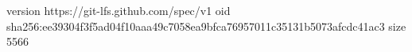 version https://git-lfs.github.com/spec/v1
oid sha256:ee39304f3f5ad04f10aaa49c7058ea9bfca76957011c35131b5073afcdc41ac3
size 5566
